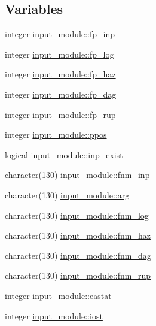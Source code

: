 \subsection*{Variables}
\begin{DoxyCompactItemize}
\item 
integer \hyperlink{namespaceinput__module_a7d1f1dd6198e0770d9218a80115df0de}{input\+\_\+module\+::fp\+\_\+inp}
\item 
integer \hyperlink{namespaceinput__module_a24121f5e413cdf763ada92cb0c916ba3}{input\+\_\+module\+::fp\+\_\+log}
\item 
integer \hyperlink{namespaceinput__module_a5b74d4c157160f6d6eaef2c725b02d6a}{input\+\_\+module\+::fp\+\_\+haz}
\item 
integer \hyperlink{namespaceinput__module_a52ffef6eb6299a12612cc0b2eb5352dc}{input\+\_\+module\+::fp\+\_\+dag}
\item 
integer \hyperlink{namespaceinput__module_a73158a89ce75123f19e014408bb9b342}{input\+\_\+module\+::fp\+\_\+rup}
\item 
integer \hyperlink{namespaceinput__module_a34271f9a9a4c0c0d531db4d9e2b05fc3}{input\+\_\+module\+::ppos}
\item 
logical \hyperlink{namespaceinput__module_af09923ed6808263d4497c13126abdb46}{input\+\_\+module\+::inp\+\_\+exist}
\item 
character(130) \hyperlink{namespaceinput__module_ad228ac099c1afd318803f2d8514dd2c9}{input\+\_\+module\+::fnm\+\_\+inp}
\item 
character(130) \hyperlink{namespaceinput__module_a7f573d3c228f74f193a801e6cb1175ef}{input\+\_\+module\+::arg}
\item 
character(130) \hyperlink{namespaceinput__module_a95df80960079d35b95016b2448da8dcc}{input\+\_\+module\+::fnm\+\_\+log}
\item 
character(130) \hyperlink{namespaceinput__module_ab37b626c8a9c8a0ad42d001c9a0e5ac4}{input\+\_\+module\+::fnm\+\_\+haz}
\item 
character(130) \hyperlink{namespaceinput__module_ae99c24908c83beaac79f68a46d079e37}{input\+\_\+module\+::fnm\+\_\+dag}
\item 
character(130) \hyperlink{namespaceinput__module_a913978d3f2a95df35b24c099c6599cd0}{input\+\_\+module\+::fnm\+\_\+rup}
\item 
integer \hyperlink{namespaceinput__module_ada333752feb1551085c3d0331da41a6d}{input\+\_\+module\+::eastat}
\item 
integer \hyperlink{namespaceinput__module_a865cd5e2924fbc40aeefe8bcb6226a75}{input\+\_\+module\+::iost}

\end{DoxyCompactItemize}
